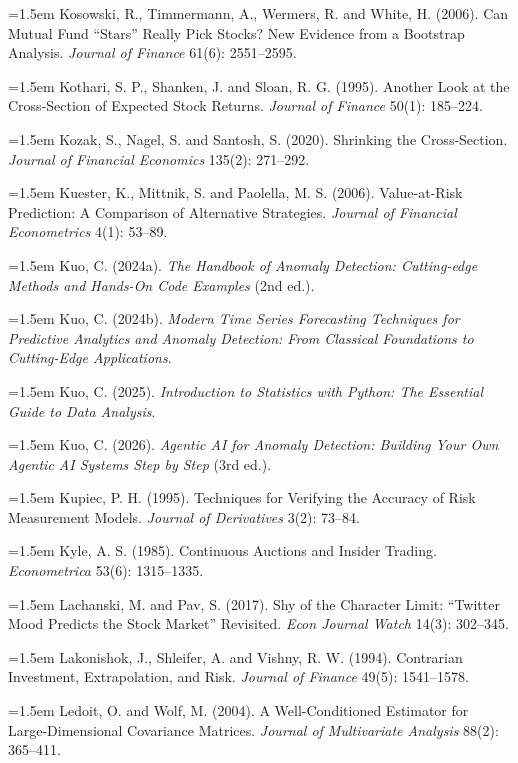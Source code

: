 \hangindent=1.5em Kosowski, R., Timmermann, A., Wermers, R. and White, H. (2006). Can Mutual Fund ``Stars'' Really Pick Stocks? New Evidence from a Bootstrap Analysis. \emph{Journal of Finance} 61(6): 2551--2595.

\hangindent=1.5em Kothari, S. P., Shanken, J. and Sloan, R. G. (1995). Another Look at the Cross-Section of Expected Stock Returns. \emph{Journal of Finance} 50(1): 185--224.

\hangindent=1.5em Kozak, S., Nagel, S. and Santosh, S. (2020). Shrinking the Cross-Section. \emph{Journal of Financial Economics} 135(2): 271--292.

\hangindent=1.5em Kuester, K., Mittnik, S. and Paolella, M. S. (2006). Value-at-Risk Prediction: A Comparison of Alternative Strategies. \emph{Journal of Financial Econometrics} 4(1): 53--89.

\hangindent=1.5em Kuo, C. (2024a). \emph{The Handbook of Anomaly Detection: Cutting-edge Methods and Hands-On Code Examples} (2nd ed.).

\hangindent=1.5em Kuo, C. (2024b). \emph{Modern Time Series Forecasting Techniques for Predictive Analytics and Anomaly Detection: From Classical Foundations to Cutting-Edge Applications}.

\hangindent=1.5em Kuo, C. (2025). \emph{Introduction to Statistics with Python: The Essential Guide to Data Analysis}.

\hangindent=1.5em Kuo, C. (2026). \emph{Agentic AI for Anomaly Detection: Building Your Own Agentic AI Systems Step by Step} (3rd ed.).

\hangindent=1.5em Kupiec, P. H. (1995). Techniques for Verifying the Accuracy of Risk Measurement Models. \emph{Journal of Derivatives} 3(2): 73--84.

\hangindent=1.5em Kyle, A. S. (1985). Continuous Auctions and Insider Trading. \emph{Econometrica} 53(6): 1315--1335.

\hangindent=1.5em Lachanski, M. and Pav, S. (2017). Shy of the Character Limit: ``Twitter Mood Predicts the Stock Market'' Revisited. \emph{Econ Journal Watch} 14(3): 302--345.

\hangindent=1.5em Lakonishok, J., Shleifer, A. and Vishny, R. W. (1994). Contrarian Investment, Extrapolation, and Risk. \emph{Journal of Finance} 49(5): 1541--1578.

\hangindent=1.5em Ledoit, O. and Wolf, M. (2004). A Well-Conditioned Estimator for Large-Dimensional Covariance Matrices. \emph{Journal of Multivariate Analysis} 88(2): 365--411.

